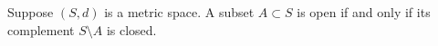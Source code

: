 Suppose $(S, d)$ is a metric space. A subset $A \subset S$ is open if and only if its complement $S \setminus A$ is closed.
